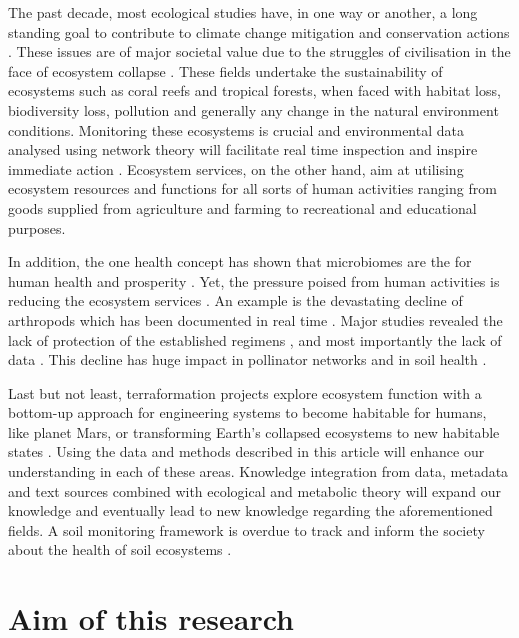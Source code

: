 The past decade, most ecological studies have, in one way or another, a long standing goal 
to contribute to climate change mitigation and conservation actions \parencite{pettorelli2012climate,fu2022a-large-scale}.
These issues are of major societal value due to the
struggles of civilisation in the face of ecosystem collapse \parencite{cavicchioli2019scientists}.
These fields undertake the
sustainability of ecosystems such as coral reefs and tropical forests, when
faced with habitat loss, biodiversity loss, pollution and generally any change
in the natural environment conditions. Monitoring these ecosystems is crucial
and environmental data analysed using network theory will facilitate real time
inspection and inspire immediate action \parencite{derocles2018Biomonitoring}.
Ecosystem services, on the other hand, aim at utilising ecosystem resources
and functions for all sorts of human activities ranging from goods supplied
from agriculture and farming \parencite{alvarez-silva2017Compartmentalized} to
recreational and educational purposes.

In addition, the one health concept has
shown that microbiomes are the for human health and prosperity
\parencite{banerjee2023Soil, lehmann2020concept}. Yet, the pressure poised from human activities
is reducing the ecosystem services \parencite{rillig2023Increasing}.
An example is the devastating decline of arthropods which has been documented in real time \parencite{wagner2021insect}.
Major studies revealed the lack of protection of the established regimens \parencite{chowdhury2023three-quarters},
and most importantly the lack of data \parencite{cardoso2019predicting}.
This decline has huge impact in pollinator networks and in soil health \parencite{insects11010054}.

Last but not least, terraformation
projects explore ecosystem function with a bottom-up approach for engineering
systems to become habitable for humans, like planet Mars, or transforming
Earth's collapsed ecosystems to new habitable states
\parencite{conde-pueyo2020Synthetic}. Using the data and methods described in this
article will enhance our understanding in each of these areas. Knowledge
integration from data, metadata and text sources combined with ecological and
metabolic theory will expand our knowledge and eventually lead to new
knowledge regarding the aforementioned fields. A soil monitoring framework 
is overdue to track and inform the society about the health of 
soil ecosystems \parencite{guerra2021tracking}.

\section{Aim of this research}
\label{sec:aim}

